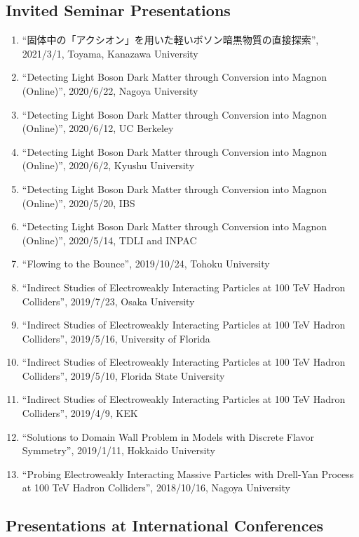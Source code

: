\documentclass[12pt]{article}
\begin{document}
\subsection*{Invited Seminar Presentations}
\begin{enumerate}
 \item ``固体中の「アクシオン」を用いた軽いボソン暗黒物質の直接探索'', 2021/3/1, Toyama, Kanazawa University
 \item ``Detecting Light Boson Dark Matter through Conversion into Magnon (Online)'', 2020/6/22, Nagoya University
 \item ``Detecting Light Boson Dark Matter through Conversion into Magnon (Online)'', 2020/6/12, UC Berkeley
 \item ``Detecting Light Boson Dark Matter through Conversion into Magnon (Online)'', 2020/6/2, Kyushu University
 \item ``Detecting Light Boson Dark Matter through Conversion into Magnon (Online)'', 2020/5/20, IBS
 \item ``Detecting Light Boson Dark Matter through Conversion into Magnon (Online)'', 2020/5/14, TDLI and INPAC
 \item ``Flowing to the Bounce'', 2019/10/24, Tohoku University
 \item ``Indirect Studies of Electroweakly Interacting Particles at 100 TeV Hadron Colliders'', 2019/7/23, Osaka University
 \item ``Indirect Studies of Electroweakly Interacting Particles at 100 TeV Hadron Colliders'', 2019/5/16, University of Florida
 \item ``Indirect Studies of Electroweakly Interacting Particles at 100 TeV Hadron Colliders'', 2019/5/10, Florida State University
 \item ``Indirect Studies of Electroweakly Interacting Particles at 100 TeV Hadron Colliders'', 2019/4/9, KEK
 \item ``Solutions to Domain Wall Problem in Models with Discrete Flavor Symmetry'', 2019/1/11, Hokkaido University
 \item ``Probing Electroweakly Interacting Massive Particles with Drell-Yan Process at 100 TeV Hadron Colliders'', 2018/10/16, Nagoya University
\end{enumerate}

\subsection*{Presentations at International Conferences}
\end{document}
